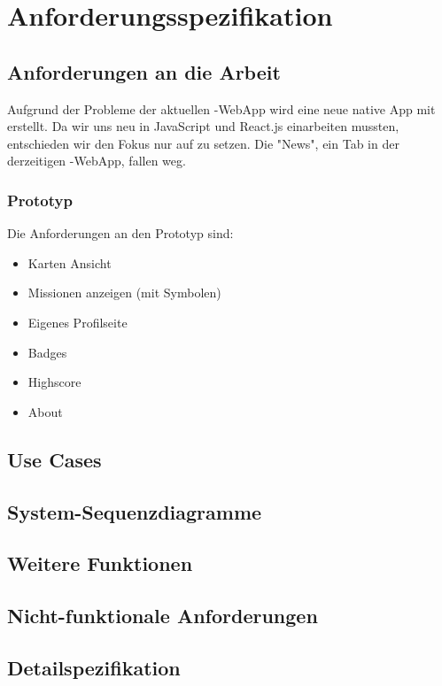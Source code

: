 \chapter{Anforderungsspezifikation}
\label{pd-anforderungsspezifikation}


\section{Anforderungen an die Arbeit} 
Aufgrund der Probleme der aktuellen \kort{}-\gls{WebApp} wird eine neue native App mit  erstellt. 
Da wir uns neu in JavaScript und React.js einarbeiten mussten, entschieden wir den Fokus nur auf  zu setzen.
Die "News", ein Tab in der derzeitigen \kort{}-\gls{WebApp}, fallen weg.


\subsection{Prototyp}
Die Anforderungen an den Prototyp sind: 

\begin{itemize}
	\item Karten Ansicht
	\item Missionen anzeigen (mit Symbolen)
	\item Eigenes Profilseite
	\item Badges
	\item Highscore
	\item About
\end{itemize}

\section{Use Cases}


\section{System-Sequenzdiagramme}


\section{Weitere Funktionen}


\section{Nicht-funktionale Anforderungen}


\section{Detailspezifikation}

